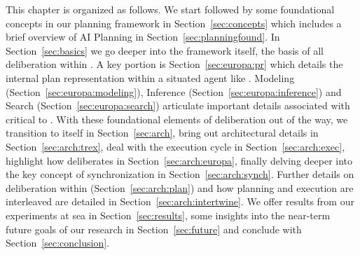 This chapter is organized as follows. We start  followed by some foundational concepts in
our planning framework in Section~\ref{sec:concepts} which includes a
brief overview of AI Planning in Section~\ref{sec:planningfound}. In
Section~\ref{sec:basics} we go deeper into the \eu framework itself,
the basis of all deliberation within \rxe. A key portion is
Section~\ref{sec:europa:pr} which details the internal plan
representation within a situated agent like \rxe. Modeling
(Section~\ref{sec:europa:modeling}), Inference
(Section~\ref{sec:europa:inference}) and Search
(Section~\ref{sec:europa:search}) articulate important details
associated with \eu critical to \rxe.  With these foundational
elements of deliberation out of the way, we transition to \rx itself
in Section~\ref{sec:arch}, bring out architectural details in
Section~\ref{sec:arch:trex}, deal with the execution cycle in
Section~\ref{sec:arch:exec}, highlight how \rx deliberates in
Section~\ref{sec:arch:europa}, finally delving deeper into the key
concept of synchronization in Section~\ref{sec:arch:synch}. Further
details on deliberation within \rx (Section~\ref{sec:arch:plan}) and
how planning and execution are interleaved are detailed in
Section~\ref{sec:arch:intertwine}. We offer results from our
experiments at sea in Section~\ref{sec:results}, some insights into
the near-term future goals of our research in Section~\ref{sec:future}
and conclude with Section~\ref{sec:conclusion}.

